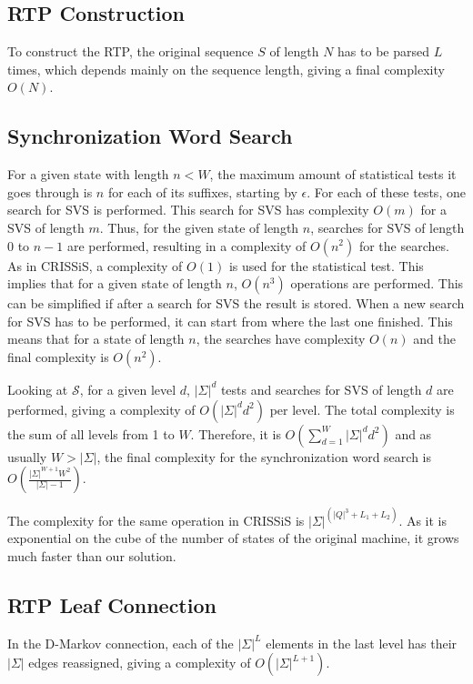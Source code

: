 {\subsection{RTP Construction}

To construct the RTP, the original sequence $S$ of length $N$ has to be parsed $L$ times, which depends mainly on the sequence length, giving a final complexity $O(N)$.

\subsection{Synchronization Word Search}

For a given state with length $n < W$, the maximum amount of statistical tests it goes through is $n$ for each of its suffixes, starting by $\epsilon$. For each of these tests, one search for SVS is performed. This search for SVS has complexity $O(m)$ for a SVS of length $m$. Thus, for the given state of length $n$, searches for SVS of length 0 to $n-1$ are performed, resulting in a complexity of $O(n^2)$ for the searches. As in CRISSiS, a complexity of $O(1)$ is used for the statistical test. This implies that for a given state of length $n$, $O(n^3)$ operations are performed. This can be simplified if after a search for SVS the result is stored. When a new search for SVS has to be performed, it can start from where the last one finished. This means that for a state of length $n$, the searches have complexity $O(n)$ and the final complexity is $O(n^2)$.

Looking at $\mathcal{S}$, for a given level $d$, $|\Sigma|^d$ tests and searches for SVS of length $d$ are performed, giving a complexity of $O(|\Sigma|^dd^2)$ per level. The total complexity is the sum of all levels from 1 to $W$. Therefore, it is $O(\sum\limits_{d=1}^{W}|\Sigma|^dd^2)$ and as usually $W > |\Sigma|$, the final complexity for the synchronization word search is $O(\frac{|\Sigma|^{W+1}W^2}{|\Sigma|-1})$. 

The complexity for the same operation in CRISSiS is $|\Sigma|^{(|Q|^3 + L_1 + L_2)}$. As it is exponential on the cube of the number of states of the original machine, it grows much faster than our solution.

\subsection{RTP Leaf Connection}

In the D-Markov connection, each of the $|\Sigma|^L$ elements in the last level has their $|\Sigma|$ edges reassigned, giving a complexity of $O(|\Sigma|^{L+1})$.

}
